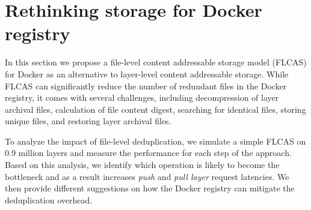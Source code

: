 \section{Rethinking storage for Docker registry}
\label{sec:file_adressable}
%
%
In this section we propose a file-level content addressable storage model (FLCAS)
for Docker as an alternative to layer-level content addressable storage.
%
%
While FLCAS can significantly reduce the number of redundant files in the Docker
registry, it comes with several challenges, including
decompression of layer archival files,
calculation of file content digest, 
searching for identical files, 
storing unique files,
and restoring layer archival files.
%
%

To analyze the impact of file-level deduplication, we simulate a simple FLCAS on
0.9 million layers and measure the performance for each step of the approach.
%
Based on this analysis, we identify which operation is likely to become the bottleneck
and as a result increases \emph{push} and \emph{pull layer} request latencies.
%
We then provide different suggestions on how the Docker registry can mitigate
the deduplication overhead.
%

